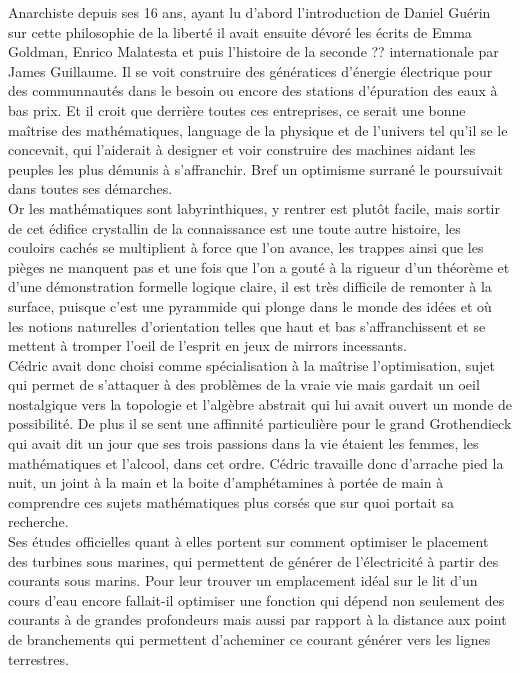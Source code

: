 \documentclass{article}
\begin{document}
Anarchiste depuis ses 16 ans, ayant lu d'abord l'introduction de Daniel Guérin
sur cette philosophie de la liberté il avait ensuite dévoré les écrits de Emma
Goldman, Enrico Malatesta et puis l'histoire de la seconde ?? internationale par
James Guillaume. Il se voit construire des génératices d'énergie électrique
pour des communnautés dans le besoin ou encore des stations d'épuration des eaux
à bas prix. Et il croit que derrière toutes ces entreprises, ce serait une
bonne maîtrise des mathématiques, language de la physique et de l'univers tel
qu'il se le concevait, qui l'aiderait à designer et voir construire des machines
aidant les peuples les plus démunis à s'affranchir. Bref un optimisme surrané le
poursuivait dans toutes ses démarches.\\

Or les mathématiques sont labyrinthiques, y rentrer est plutôt facile, mais sortir
de cet édifice crystallin de la connaissance est une toute autre histoire, les couloirs
cachés se multiplient à force que l'on avance, les trappes ainsi que les pièges
ne manquent pas et une fois que l'on a gouté à la rigueur d'un théorème et d'une
démonstration formelle logique claire, il est très difficile de remonter à la
surface, puisque c'est une pyrammide qui plonge dans le monde des idées et où
les notions naturelles d'orientation telles que haut et bas s'affranchissent et
se mettent à tromper l'oeil de l'esprit en jeux de mirrors incessants.\\


Cédric avait donc choisi comme spécialisation à la maîtrise l'optimisation,
sujet qui permet de s'attaquer à des problèmes de la vraie vie mais gardait un
oeil nostalgique vers la topologie et l'algèbre abstrait qui lui avait ouvert un
monde de possibilité. De plus il se sent une affinnité particulière pour le
grand Grothendieck qui avait dit un jour que ses trois passions dans la vie
étaient les femmes, les mathématiques et l'alcool, dans cet ordre. Cédric
travaille donc d'arrache pied la nuit, un joint à la main et la boite
d'amphétamines à portée de main à comprendre ces sujets mathématiques plus
corsés que sur quoi portait sa recherche. \\

Ses études officielles quant à elles portent sur comment optimiser le
placement des turbines sous marines, qui permettent de générer de l'électricité
à partir des courants sous marins. Pour leur trouver un emplacement idéal sur le
lit d'un cours d'eau encore fallait-il optimiser une fonction qui dépend non
seulement des courants à de grandes profondeurs mais aussi par rapport à la
distance aux point de branchements qui permettent d'acheminer ce courant
générer vers les lignes terrestres. \\
\end{document}
